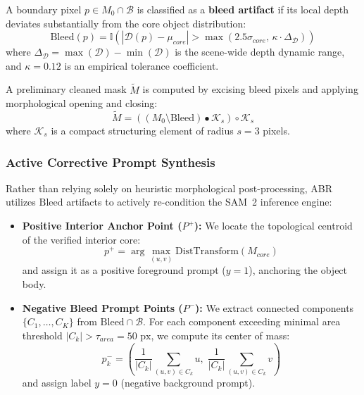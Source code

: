 \documentclass[10pt,twocolumn,letterpaper]{article}
\begin{document}
A boundary pixel $p \in M_0 \cap \mathcal{B}$ is classified as a \textbf{bleed artifact} if its local depth deviates substantially from the core object distribution:
\begin{equation}
\mathrm{Bleed}(p) = \mathbb{I}\left( |\mathcal{D}(p) - \mu_{core}| > \max(2.5 \sigma_{core}, \, \kappa \cdot \Delta_{\mathcal{D}}) \right)
\label{eq:bleed}
\end{equation}
where $\Delta_{\mathcal{D}} = \max(\mathcal{D}) - \min(\mathcal{D})$ is the scene-wide depth dynamic range, and $\kappa = 0.12$ is an empirical tolerance coefficient.

A preliminary cleaned mask $\tilde{M}$ is computed by excising bleed pixels and applying morphological opening and closing:
\begin{equation}
\tilde{M} = \left((M_0 \setminus \mathrm{Bleed}) \bullet \mathcal{K}_s\right) \circ \mathcal{K}_s
\end{equation}
where $\mathcal{K}_s$ is a compact structuring element of radius $s = 3$ pixels.

\subsubsection{Active Corrective Prompt Synthesis}
Rather than relying solely on heuristic morphological post-processing, ABR utilizes $\mathrm{Bleed}$ artifacts to actively re-condition the SAM~2 inference engine:
\begin{itemize}[leftmargin=*,itemsep=1pt]
    \item \textbf{Positive Interior Anchor Point ($P^+$):} We locate the topological centroid of the verified interior core:
    \begin{equation}
    p^+ = \arg\max_{(u,v)} \mathrm{DistTransform}(M_{core})
    \end{equation}
    and assign it as a positive foreground prompt ($y = 1$), anchoring the object body.
    \item \textbf{Negative Bleed Prompt Points ($P^-$):} We extract connected components $\{C_1, \dots, C_K\}$ from $\mathrm{Bleed} \cap \mathcal{B}$. For each component exceeding minimal area threshold $|C_k| > \tau_{area} = 50\text{ px}$, we compute its center of mass:
    \begin{equation}
    p_k^- = \left( \frac{1}{|C_k|} \sum_{(u,v) \in C_k} u, \; \frac{1}{|C_k|} \sum_{(u,v) \in C_k} v \right)
    \end{equation}
    and assign label $y = 0$ (negative background prompt).
\end{itemize}
\end{document}
